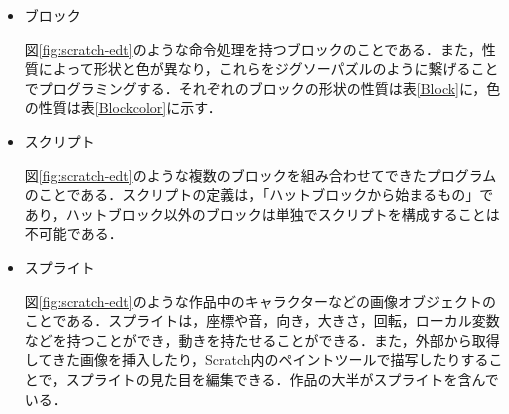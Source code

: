 \documentclass[11pt]{jreport}
\begin{document}
\begin{itemize}
  \item ブロック

図\ref{fig:scratch-edt}のような命令処理を持つブロックのことである．また，性質によって形状と色が異なり，これらをジグソーパズルのように繋げることでプログラミングする．それぞれのブロックの形状の性質は表\ref{Block}に，色の性質は表\ref{Blockcolor}に示す．

  \item スクリプト

図\ref{fig:scratch-edt}のような複数のブロックを組み合わせてできたプログラムのことである．スクリプトの定義は，「ハットブロックから始まるもの」であり，ハットブロック以外のブロックは単独でスクリプトを構成することは不可能である．

  \item スプライト

図\ref{fig:scratch-edt}のような作品中のキャラクターなどの画像オブジェクトのことである．スプライトは，座標や音，向き，大きさ，回転，ローカル変数などを持つことができ，動きを持たせることができる．また，外部から取得してきた画像を挿入したり，Scratch内のペイントツールで描写したりすることで，スプライトの見た目を編集できる．作品の大半がスプライトを含んでいる．

\end{itemize}
\end{document}
